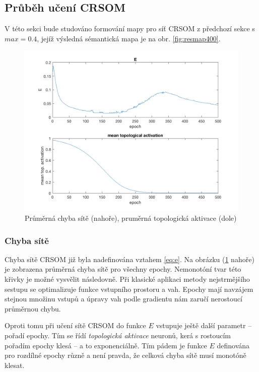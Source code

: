 \documentclass[thesis=M,czech]{FITthesis}[2012/06/26]
\begin{document}
\subsection{Průběh učení CRSOM}
V této sekci bude studováno formování mapy pro síť CRSOM z předchozí sekce s $max=0.4$, jejíž výsledná sémantická mapa je na obr. \ref{fig:resmap400}. 

\begin{figure}[htbp]
    \begin{center}
	\includegraphics[scale=0.25]{mse_top.png}
	
    \caption{Průměrná chyba sítě (nahoře), pruměrná topologická aktivace (dole)} 
    \end{center}
     \label{fig:msetopp}
\end{figure}

\subsubsection*{Chyba sítě}
Chyba sítě CRSOM již byla nadefinována vztahem \ref{eq:e}. Na obrázku (\ref{fig:msetopp} nahoře) je zobrazena průměrná chyba sítě pro všechny epochy. Nemonotóní tvar této křivky je možné vysvělit následovně. Při klasické aplikaci metody nejstrmějšího sestupu se optimalizuje funkce vstupního prostoru a vah. Epochy mají navzájem stejnou množinu vstupů a úpravy vah podle gradientu nám zaručí nerostoucí průměrnou chybu.


Oproti tomu při učení sítě CRSOM do funkce $E$ vstupuje ještě další parametr -- pořadí epochy. Tím se řídí \textit{topologická aktivace} neuronů, kerá s rostoucím pořadím epochy klesá -- a to exponenciálně. Tím pádem je funkce $E$ definována pro rozdílné epochy různě a není pravda, že celková chyba sítě musí monotóně klesat.
\end{document}
